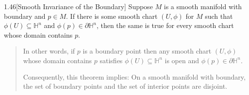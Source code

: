 \begin{theorem}{1.46}[Smooth Invariance of the Boundary]
    Suppose \( M \) is a smooth manifold with boundary and \( p \in M \). If there is some smooth chart \( (U, \phi) \) for \( M \) such that \( \phi(U) \subseteq \mathbb{H}^{n} \) and \( \phi(p) \in \partial \mathbb{H}^{n} \), then the same is true for every smooth chart whose domain contains \( p \).
\end{theorem}

\begin{quotation}
    In other words, if \( p \) is a boundary point then any smooth chart \( (U, \phi) \) whose domain contains \( p \) satisfies \( \phi(U) \subseteq \mathbb{H}^{n} \) is open and \( \phi(p) \in \partial \mathbb{H}^{n} \).

    Consequently, this theorem implies: On a smooth manifold with boundary, the set of boundary points and the set of interior points are disjoint.
\end{quotation}

